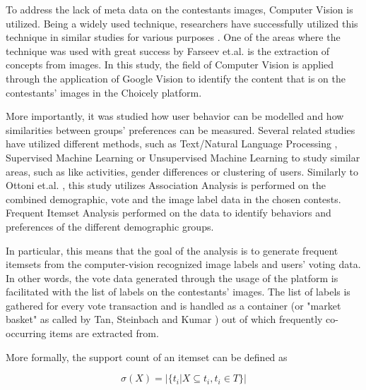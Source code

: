 To address the lack of meta data on the contestants images, Computer Vision is utilized. Being a widely used technique, researchers have successfully utilized this technique in similar studies for various purposes \cite{hu2014we, farseev2015harvestingmultiplesources, han2016teensarefrommars, bakhshi2014faces}. One of the areas where the technique was used with great success by Farseev et.al. \cite{farseev2015harvestingmultiplesources} is the extraction of concepts from images. In this study, the field of Computer Vision is applied through the application of Google Vision to identify the content that is on the contestants' images in the Choicely platform. 

More importantly, it was studied how user behavior can be modelled and how similarities between groups' preferences can be measured. Several related studies have utilized different methods, such as Text/Natural Language Processing \cite{ottoni2013ladies, farseev2015harvestingmultiplesources, jang2016teensengagemorewithfewerphotos, kabinsingha2012movie, han2016teensarefrommars}, Supervised Machine Learning \cite{chinesemobilebankingusers, saraee2004data, kabinsingha2012movie, farseev2015harvestingmultiplesources, han2016teensarefrommars, jang2015no, bakhshi2014faces} or Unsupervised Machine Learning \cite{saraee2004data, hu2014we, jang2015no} to study similar areas, such as like activities, gender differences or clustering of users. Similarly to Ottoni et.al. \cite{ottoni2013ladies}, this study utilizes Association Analysis is performed on the combined demographic, vote and the image label data in the chosen contests. Frequent Itemset Analysis \cite{introtodatamining} performed on the data to identify behaviors and preferences of the different demographic groups. 

In particular, this means that the goal of the analysis is to generate frequent itemsets from the computer-vision recognized image labels and users' voting data. In other words, the vote data generated through the usage of the platform is facilitated with the list of labels on the contestants' images. The list of labels is gathered for every vote transaction and is handled as a container (or "market basket" as called by Tan, Steinbach and Kumar \cite{introtodatamining}) out of which frequently co-occurring items are extracted from. 

More formally, the support count of an itemset can be defined as

\begin{equation}
    \sigma (X) = |\{ t_i | X \subseteq t_i, t_i \in T \}|
\end{equation}

